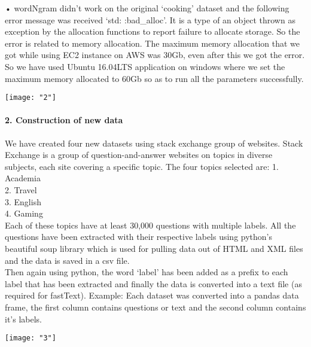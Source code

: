 \documentclass[12pt]{article}
\begin{document}
\noindent•	wordNgram didn’t work on the original ‘cooking’ dataset and the following error message was received            ‘std: :bad\_alloc’. It is a type of an object thrown as exception by the allocation functions to report failure to allocate storage. So the error is related to memory allocation. The maximum memory allocation that we got while using EC2 instance on AWS was 30Gb, even after this we got the error. So we have used Ubuntu 16.04LTS application on windows where we set the maximum memory allocated to 60Gb so as to run all the parameters successfully. 

\begin{center}
	\begin{minipage}{\linewidth}
		\centering
		\texttt{[image: "2"]}
		
	\end{minipage}
\end{center}

\noindent\paragraph{2.	Construction of new data}
We have created four new datasets using stack exchange group of websites. Stack Exchange is a group of question-and-answer websites on topics in diverse subjects, each site covering a specific topic. The four topics selected are:
1.	Academia\\	
2.	Travel\\
3.	English\\
4.	Gaming\\
Each of these topics have at least 30,000 questions with multiple labels.  All the questions have been extracted with their respective labels using python’s beautiful soup library which is used for pulling data out of HTML and XML files and the data is saved in a csv file.  \\

\noindent Then again using python, the word ‘label’ has been added as a prefix to each label that has been extracted and finally the data is converted into a text file (as required for fastText). 
Example:  Each dataset was converted into a pandas data frame, the first column contains questions or text and the second column contains it’s labels. \\


\begin{center}
	\begin{minipage}{\linewidth}
		\centering
		\texttt{[image: "3"]}
		
	\end{minipage}
\end{center}
\end{document}

